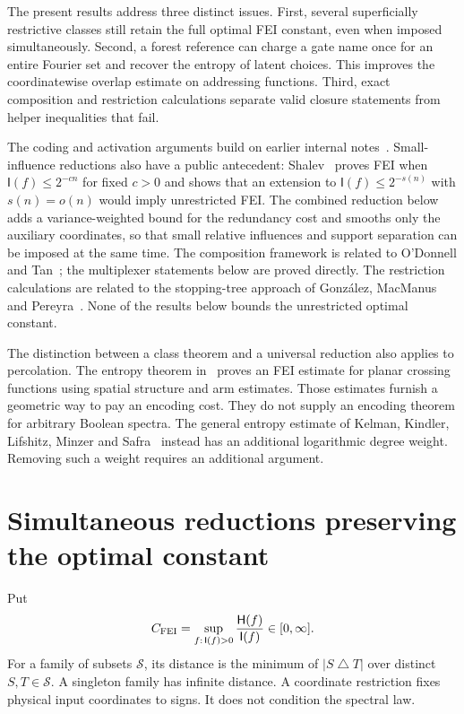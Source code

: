 \documentclass[11pt]{amsart}
\theoremstyle{definition}
\theoremstyle{remark}
\newcommand{\HH}{\mathsf H}
\newcommand{\I}{\mathsf I}
\begin{document}
The present results address three distinct issues. First, several superficially restrictive classes still retain the full optimal FEI constant, even when imposed simultaneously. Second, a forest reference can charge a gate name once for an entire Fourier set and recover the entropy of latent choices. This improves the coordinatewise overlap estimate on addressing functions. Third, exact composition and restriction calculations separate valid closure statements from helper inequalities that fail.

The coding and activation arguments build on earlier internal notes~\cite{BrainErasure,BrainCritical}. Small-influence reductions also have a public antecedent: Shalev~\cite{Shalev18} proves FEI when $\I(f)\le2^{-cn}$ for fixed $c>0$ and shows that an extension to $\I(f)\le2^{-s(n)}$ with $s(n)=o(n)$ would imply unrestricted FEI. The combined reduction below adds a variance-weighted bound for the redundancy cost and smooths only the auxiliary coordinates, so that small relative influences and support separation can be imposed at the same time. The composition framework is related to O'Donnell and Tan~\cite{ODT13}; the multiplexer statements below are proved directly. The restriction calculations are related to the stopping-tree approach of Gonz\'alez, MacManus and Pereyra~\cite{GMP26}. None of the results below bounds the unrestricted optimal constant.

The distinction between a class theorem and a universal reduction also applies to percolation. The entropy theorem in~\cite{Percolation} proves an FEI estimate for planar crossing functions using spatial structure and arm estimates. Those estimates furnish a geometric way to pay an encoding cost. They do not supply an encoding theorem for arbitrary Boolean spectra. The general entropy estimate of Kelman, Kindler, Lifshitz, Minzer and Safra~\cite{KKLMS20} instead has an additional logarithmic degree weight. Removing such a weight requires an additional argument.

\section{Simultaneous reductions preserving the optimal constant}\label{sec:hardening}

Put
\[
 C_{\rm FEI}=\sup_{f:\,\I(f)>0}\frac{\HH(f)}{\I(f)}\in[0,\infty].
\]
For a family of subsets $\mathcal S$, its distance is the minimum of $|S\mathbin\triangle T|$ over distinct $S,T\in\mathcal S$. A singleton family has infinite distance. A coordinate restriction fixes physical input coordinates to signs. It does not condition the spectral law.
\end{document}
